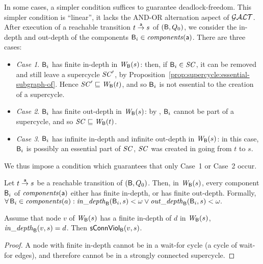 In some cases, a simpler condition suffices to guarantee deadlock-freedom. This simpler condition is ``linear'', \ie it lacks the AND-OR alternation
aspect of $\GAO$. After execution of a reachable transition $t \goesto[\act] s$ of $(\B, Q_0)$, 
we consider the in-depth and out-depth of the components $\B_i \in \cmps{\act}$. There are three cases:
%
\begin{itemize}

\item \emph{Case 1}. \label{case:finite-in} $\B_i$ has finite in-depth in $\wfg{\B}{s}$: then, if $\B_i \in \SC$, it can be removed and still leave a
  supercycle $\SC'$, by Proposition~\ref{prop:supercycle:essential-subgraph-of}. Hence $\SC' \subg \wfg{\B}{t}$, and so $\B_i$ is not essential
  to the creation of a supercycle.

\item \emph{Case 2}. \label{case:finite-out} $\B_i$ has finite out-depth in $\wfg{\B}{s}$: by , $\B_i$ cannot be
  part of a supercycle, and so $\SC \subg \wfg{\B}{t}$.

\item \emph{Case 3}. \label{case:infinite-both} $\B_i$ has infinite in-depth and infinite out-depth in $\wfg{\B}{s}$: in this case, $\B_i$ is possibly
  an essential part of $\SC$, \ie $\SC$ was created in going from $t$ to $s$.

\end{itemize}
We thus impose a condition which guarantees that only Case~1 or Case~2 occur. 



\begin{definition} \label{def:global:dfc}
Let $t \goesto[\act] s$ be a reachable transition of $(\B, Q_0)$.
Then, in $\wfg{\B}{s}$,  every component $\B_i$ of $\cmps{\act}$ either has finite in-depth, or has finite out-depth.
Formally, \\
\ind  $\fa \B_i \in \cmps{a}: \widepth{\B}{\B_i}{s} < \omega \lor \wodepth{\B}{\B_i}{s} < \omega.$
\end{definition}



\begin{proposition} \label{prop:indepth-finite-implies-scViol}
Assume that node $v$ of $\wfg{\B}{s}$ has a finite in-depth of $d$ in $\wfg{\B}{s}$, \ie 
$\widepth{\B}{v}{s} = d$. Then $\connViol{v}{s}$.
\end{proposition}
%
\begin{proof}
A node with finite in-depth cannot be in a wait-for cycle (\ie a cycle
of wait-for edges), and therefore cannot be in a strongly connected supercycle.
\end{proof}





